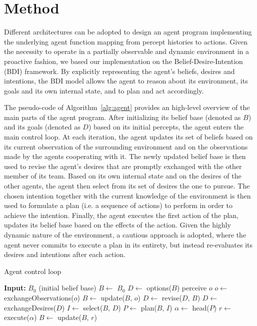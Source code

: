 \section{Method}

Different architectures can be adopted to design an agent program implementing the underlying agent function mapping from percept histories to actions. Given the necessity to operate in a partially observable and dynamic environment in a proactive fashion, we based our implementation on the Belief-Desire-Intention (BDI) framework. By explicitly representing the agent's beliefs, desires and intentions, the BDI model allows the agent to reason about its environment, its goals and its own internal state, and to plan and act accordingly.

The pseudo-code of Algorithm~\ref{alg:agent} provides an high-level overview of the main parts of the agent program. After initializing its belief base (denoted as $B$) and its goals (denoted as $D$) based on its initial percepts, the agent enters the main control loop. At each iteration, the agent updates its set of beliefs based on its current observation of the surrounding environment and on the observations made by the agents cooperating with it. The newly updated belief base is then used to revise the agent's desires that are promptly exchanged with the other member of its team. Based on its own internal state and on the desires of the other agents, the agent then select from its set of desires the one to pursue. The chosen intention together with the current knowledge of the environment is then used to formulate a plan (i.e. a sequence of actions) to perform in order to achieve the intention. Finally, the agent executes the first action of the plan, updates its belief base based on the effects of the action. Given the highly dynamic nature of the environment, a cautious approach is adopted, where the agent never commits to execute a plan in its entirety, but instead re-evaluates its desires and intentions after each action.

\begin{algorithm}
    \caption{Agent control loop}
    \label{alg:agent}
    \begin{algorithmic}
        \item \textbf{Input:} $B_0$ (initial belief base)
        \State $B \gets$ $B_0$
        \State $D \gets$ options($B$)
        \State perceive $o$
        \State $o \gets$ exchangeObservations($o$)
        \State $B \gets$ update($B$, $o$)
        \State $D \gets$ revise($D$, $B$)
        \State $D \gets$ exchangeDesires($D$)
        \State $I \gets$ select($B$, $D$)
        \State $P \gets$ plan($B$, $I$)
        \State $\alpha \gets$ head($P$)
        \State $r \gets$ execute($\alpha$)
        \State $B \gets$ update($B$, $r$)
        \EndWhile
    \end{algorithmic}
\end{algorithm}

